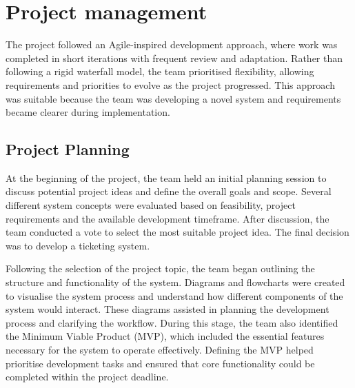 \chapter{Project management}
\label{chap:project-management}

The project followed an Agile-inspired development approach, where work was completed in short iterations with frequent review and adaptation. Rather than following a rigid waterfall model, the team prioritised flexibility, allowing requirements and priorities to evolve as the project progressed. This approach was suitable because the team was developing a novel system and requirements became clearer during implementation.

\section{Project Planning}
At the beginning of the project, the team held an initial planning session to discuss potential project ideas and define the overall goals and scope. Several different system concepts were evaluated based on feasibility, project requirements and the available development timeframe. After discussion, the team conducted a vote to select the most suitable project idea. The final decision was to develop a ticketing system.

Following the selection of the project topic, the team began outlining the structure and functionality of the system. Diagrams and flowcharts were created to visualise the system process and understand how different components of the system would interact. These diagrams assisted in planning the development process and clarifying the workflow. During this stage, the team also identified the Minimum Viable Product (MVP), which included the essential features necessary for the system to operate effectively. Defining the MVP helped prioritise development tasks and ensured that core functionality could be completed within the project deadline.

